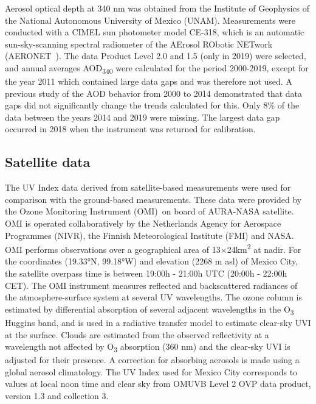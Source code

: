 \documentclass[journal=jacsat,manuscript=article]{achemso}
\begin{document}
Aerosol optical depth at 340 nm was obtained from the Institute of
Geophysics of the National Autonomous University of Mexico (UNAM).
Measurements were conducted with a CIMEL sun photometer model CE-318,
which is an automatic sun-sky-scanning spectral radiometer of
the AErosol RObotic NETwork (AERONET~\citep{Holben_1998}). The data
Product Level 2.0 and 1.5 (only in 2019) were selected, and annual
averages AOD\textsubscript{340} were calculated for the period 2000-2019,
except for the year 2011 which contained large data gaps and was therefore not used.
A previous study of the AOD behavior from 2000 to 2014 demonstrated that data gaps did not
significantly change the trends calculated for this.\citep{Carabali_2017}
Only 8\% of the data between the years 2014 and 2019 were missing.
The largest data gap occurred in 2018 when the instrument was returned for calibration.


\subsection{Satellite data}

The UV Index data derived from satellite-based measurements
were used for comparison with the ground-based measurements.
These data were provided by the Ozone Monitoring
Instrument (OMI)~on board of AURA-NASA satellite.\citep{dcio} OMI
is operated collaboratively by the Netherlands Agency for Aerospace
Programmes (NIVR), the Finnish Meteorological Institute (FMI) and NASA.
OMI performs observations over a geographical area of 13$\times$24km\textsuperscript{2} at nadir. For
the coordinates (19.33°N, 99.18°W) and elevation (2268 m asl) of Mexico City,
the satellite overpass time is between 19:00h - 21:00h UTC (20:00h - 22:00h CET).
The OMI instrument measures reflected and backscattered radiances of the atmosphere-surface system at several UV wavelengths.\cite{Tanskanen_2006} The ozone column is estimated by differential absorption of several adjacent
wavelengths in the O\textsubscript{3} Huggins band\citep{Veefkind_2006}, and is used in a radiative transfer model to estimate clear-sky UVI at the surface. Clouds are estimated from the observed reflectivity at a wavelength not affected by O\textsubscript{3} absorption (360 nm) and the clear-sky UVI is adjusted for their presence.\cite{Tanskanen_2007} A correction for absorbing aerosols is made using a global aerosol climatology.\citep{Arola_2009}
The UV Index used for Mexico City corresponds to values at local noon time and clear sky
from OMUVB Level 2 OVP data product, version 1.3 and collection 3.
\end{document}
